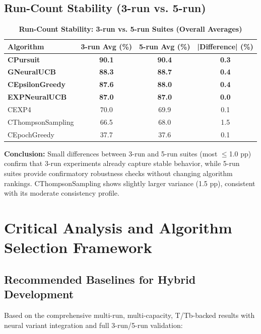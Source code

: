 \documentclass[12pt,a4paper]{article}
\newcommand{\success}[1]{\textcolor{successcolor}{\textbf{#1}}}
\newcommand{\legacy}[1]{\textcolor{legacycolor}{\textbf{#1}}}
\newcommand{\neural}[1]{\textcolor{neuralcolor}{\textbf{#1}}}
\begin{document}
\subsection{Run-Count Stability (3-run vs. 5-run)}

\begin{table}[H]
\centering
\caption{\success{Run-Count Stability: 3-run vs. 5-run Suites (Overall Averages)}}
\begin{tabular}{|l|c|c|c|}
\hline
\textbf{Algorithm} & \textbf{3-run Avg (\%)} & \textbf{5-run Avg (\%)} & \textbf{|Difference| (\%)} \\
\hline
\hline
\success{CPursuit}        & \success{90.1} & \success{90.4} & \success{0.3} \\
\neural{GNeuralUCB}       & \neural{88.3} & \neural{88.7} & \neural{0.4} \\
\success{CEpsilonGreedy} & \success{87.6} & \success{88.0} & \success{0.4} \\
\legacy{EXPNeuralUCB}    & \legacy{87.0} & \legacy{87.0} & \legacy{0.0} \\
CEXP4                    & 70.0          & 69.9          & 0.1 \\
CThompsonSampling        & 66.5          & 68.0          & 1.5 \\
CEpochGreedy             & 37.7          & 37.6          & 0.1 \\
\hline
\end{tabular}
\end{table}

\textbf{Conclusion:} Small differences between 3-run and 5-run suites (most $\leq$1.0 pp) confirm that 3-run experiments already capture stable behavior, while 5-run suites provide confirmatory robustness checks without changing algorithm rankings. CThompsonSampling shows slightly larger variance (1.5 pp), consistent with its moderate consistency profile.

\section{Critical Analysis and Algorithm Selection Framework}

\subsection{Recommended Baselines for Hybrid Development}

Based on the comprehensive multi-run, multi-capacity, T/Tb-backed results with neural variant integration and full 3-run/5-run validation:
\end{document}
